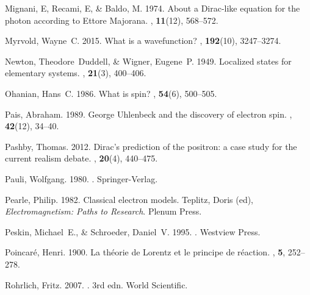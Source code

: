 \documentclass[onecolumn,secnumarabic,amsmath,amssymb,balancelastpage,nofootinbib]{article}
\begin{document}
\begin{thebibliography}{}
Mignani, E, Recami, E, \& Baldo, M. 1974.
\newblock About a Dirac-like equation for the photon according to Ettore
  Majorana.
, {\bf 11}(12), 568--572.

Myrvold, Wayne~C. 2015.
\newblock What is a wavefunction?
, {\bf 192}(10), 3247--3274.

Newton, Theodore~Duddell, \& Wigner, Eugene~P. 1949.
\newblock Localized states for elementary systems.
, {\bf 21}(3), 400--406.

Ohanian, Hans~C. 1986.
\newblock What is spin?
, {\bf 54}(6), 500--505.

Pais, Abraham. 1989.
\newblock George Uhlenbeck and the discovery of electron spin.
, {\bf 42}(12), 34--40.

Pashby, Thomas. 2012.
\newblock Dirac's prediction of the positron: a case study for the current
  realism debate.
, {\bf 20}(4), 440--475.

Pauli, Wolfgang. 1980.
.
\newblock Springer-Verlag.

Pearle, Philip. 1982.
\newblock Classical electron models.
 Teplitz, Doris (ed), {\em Electromagnetism:
  Paths to Research}.
\newblock Plenum Press.

Peskin, Michael~E., \& Schroeder, Daniel~V. 1995.
.
\newblock Westview Press.

Poincar\'{e}, Henri. 1900.
\newblock La th\'{e}orie de Lorentz et le principe de r\'{e}action.
,
  {\bf 5}, 252--278.

Rohrlich, Fritz. 2007.
. 3rd edn.
\newblock World Scientific.


\end{thebibliography}
\end{document}
